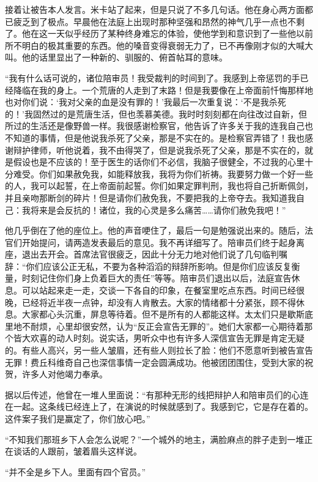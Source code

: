 \par 接着让被告本人发言。米卡站了起来，但是只说了不多几句话。他在身心两方面都已疲乏到了极点。早晨他在法庭上出现时那种坚强和昂然的神气几乎一点也不剩了。他在这一天似乎经历了某种终身难忘的体验，使他学到和意识到了一些他以前所不明白的极其重要的东西。他的嗓音变得衰弱无力了，已不再像刚才似的大喊大叫。他的话里显出了一种新的、驯服的、俯首帖耳的意味。
\par “我有什么话可说的，诸位陪审员！我受裁判的时间到了。我感到上帝惩罚的手已经降临在我的身上。一个荒唐的人走到了末路！但是我要像在上帝面前忏悔那样地也对你们说：‘我对父亲的血是没有罪的！’我最后一次重复说：‘不是我杀死的！’我固然过的是荒唐生活，但也羡慕美德。我时时刻刻都在向往改过自新，但所过的生活还是像野兽一样。我很感谢检察官，他告诉了许多关于我的连我自己也不知道的事情，但是他说我杀死了父亲，那是不实在的。是检察官弄错了！我也感谢辩护律师，听他说着，我不由得哭了，但是说我杀死了父亲，那是不实在的，就是假设也是不应该的！至于医生的话你们不必信，我脑子很健全，不过我的心里十分难受。你们如果赦免我，如能释放我，我将为你们祈祷。我要努力做一个好一些的人，我可以起誓，在上帝面前起誓。你们如果定罪判刑，我也将自己折断佩剑，并且亲吻那断剑的碎片！但是请你们赦免我，不要把我的上帝夺去。我知道我自己：我将来是会反抗的！诸位，我的心灵是多么痛苦……请你们赦免我吧！”
\par 他几乎倒在了他的座位上。他的声音哽住了，最后一句是勉强说出来的。随后，法官们开始提问，请两造发表最后的意见。我不再详细写了。陪审员们终于起身离座，退出去开会。首席法官很疲乏，因此十分无力地对他们说了几句临判嘱辞：“你们应该公正无私，不要为各种滔滔的辩辞所影响。但是你们应该反复衡量，时刻记住你们身上负着巨大的责任”等等。陪审员们退出以后，法庭宣告休息。可以站起来走一走，交谈一下各自的印象，在餐室里吃点东西。时间已经很晚，已经将近半夜一点钟，却没有人肯散去。大家的情绪都十分紧张，顾不得休息。大家都心头沉重，屏息等待着。但不是所有的人都能这样。太太们只是歇斯底里地不耐烦，心里却很安然，认为“反正会宣告无罪的”。她们大家都一心期待着那个皆大欢喜的动人时刻。说实话，男听众中也有许多人深信宣告无罪是肯定无疑的。有些人高兴，另一些人皱眉，还有些人则拉长了脸：他们不愿意听到被告宣告无罪！费丘科维奇自己也深信事情一定会圆满成功。他被团团围住，受到大家的祝贺，许多人对他竭力奉承。
\par 据以后传述，他曾在一堆人里面说：“有那种无形的线把辩护人和陪审员们的心连在一起。这条线已经连上了，在演说的时候就感到了。我感到它，它是存在着的。这件案子我们是赢定了，你们放心吧。”
\par “不知我们那班乡下人会怎么说呢？”一个城外的地主，满脸麻点的胖子走到一堆正在谈话的人跟前，皱着眉头这样说。
\par “并不全是乡下人。里面有四个官员。”
